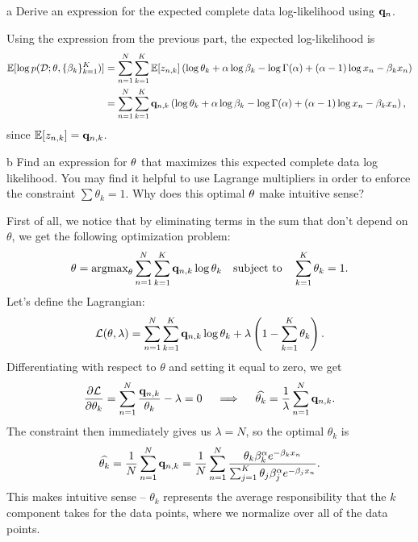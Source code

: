 \documentclass[expanded]{lkx_pset}
\begin{document}
\begin{solution}
	\begin{parts}
		\begin{part}{a}
			Derive an expression for the expected complete data log-likelihood using $\mathbf{q}_n$.
		\end{part}

		Using the expression from the previous part, the expected log-likelihood is
		\[
			\begin{aligned}
				\mathbb{E}[\log p(\mathcal{D}; \mathbf{\theta},\{\beta_k\}_{k=1}^K)]
				 & = \sum_{n=1}^N\sum_{k=1}^K \mathbb{E}[z_{n,k}]\left(\log \theta_k + \alpha\log\beta_k - \log \Gamma(\alpha)+(\alpha-1)\log x_n - \beta_k x_n\right)    \\
				 & = \sum_{n=1}^N\sum_{k=1}^K \mathbf{q}_{n,k} \left(\log \theta_k + \alpha\log\beta_k - \log \Gamma(\alpha)+(\alpha-1)\log x_n - \beta_k x_n\right),
			\end{aligned}
		\]
		since $\mathbb{E}[z_{n,k}]=\mathbf{q}_{n,k}$.

		\begin{part}{b}
			Find an expression for $\mathbf{\theta}$ that maximizes this expected complete data log likelihood. You may find it helpful to use Lagrange multipliers in order to enforce the constraint $\sum \theta_k = 1$. Why does this optimal $\mathbf{\theta}$ make intuitive sense?
		\end{part}

		First of all, we notice that by eliminating terms in the sum that don't depend on $\theta$, we get the following optimization problem:
		\[
			\theta = \textrm{argmax}_{\theta}\sum^N_{n=1}\sum^K_{k=1} \mathbf{q}_{n,k}\log \theta_k\quad\textrm{subject to}\quad \sum_{k=1}^K \theta_k = 1.
		\]
		Let's define the Lagrangian:
		\[
			\mathcal{L}(\mathbf{\theta}, \lambda) = \sum_{n=1}^N\sum_{k=1}^K \mathbf{q}_{n,k} \log\theta_k + \lambda\left(1-\sum^K_{k=1}\theta_k\right).
		\]
		Differentiating with respect to $\theta$ and setting it equal to zero, we get
		\[
			\frac{\partial \mathcal{L}}{\partial \theta_k} = \sum^N_{n=1}\frac{\mathbf{q}_{n,k}}{\theta_k} - \lambda = 0 \quad\implies\quad \widehat{\theta_k} = \frac{1}{\lambda}\sum^N_{n=1}\mathbf{q}_{n,k}.
		\]
		The constraint then immediately gives us $\lambda=N$, so the optimal $\theta_k$ is
		\[
			\widehat{\theta_k} = \frac{1}{N}\sum^N_{n=1}\mathbf{q}_{n,k} = \frac{1}{N} \sum^N_{n=1}\frac{ \theta_k \beta_k^\alpha e^{-\beta_k x_n}}{\sum_{j=1}^K\theta_j \beta_j^\alpha e^{-\beta_j x_n}}.
		\]
		This makes intuitive sense -- $\theta_k$ represents the average responsibility that the $k$ component takes for the data points, where we normalize over all of the data points.


\end{parts}
\end{solution}
\end{document}
